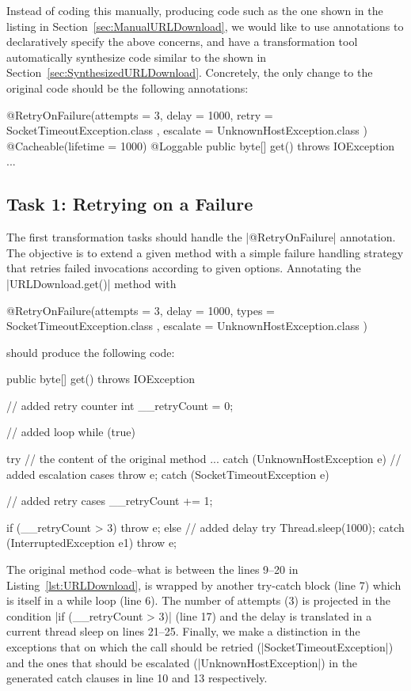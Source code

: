 Instead of coding this manually, producing code such as the one shown in the listing in Section~\ref{sec:ManualURLDownload}, we would like to use annotations to declaratively specify the above concerns, and have a transformation tool automatically synthesize code similar to the shown in Section~\ref{sec:SynthesizedURLDownload}.
Concretely, the only change to the original code should be the following annotations:
%
\begin{javacode}
@RetryOnFailure(attempts = 3, delay = 1000, retry = { SocketTimeoutException.class }, escalate = { UnknownHostException.class })
@Cacheable(lifetime = 1000)
@Loggable
public byte[] get() throws IOException { ... }
\end{javacode}

\subsection{Task 1: Retrying on a Failure}

The first transformation tasks should handle the \javainline|@RetryOnFailure| annotation.
The objective is to extend a given method with a simple failure handling strategy that retries failed invocations according to given options.
Annotating the \javainline|URLDownload.get()| method with
%
\begin{javacode}
@RetryOnFailure(attempts = 3, delay = 1000, types = { SocketTimeoutException.class }, escalate = { UnknownHostException.class })
\end{javacode}
%
should produce the following code:
%
\begin{javacode}
public byte[] get() throws IOException {
  // added retry counter 
  int __retryCount = 0;

  // added loop
  while (true) {
    try {
      // the content of the original method
      ...
    } catch (UnknownHostException e) {
      // added escalation cases
      throw e;
    } catch (SocketTimeoutException e) {
      // added retry cases
      __retryCount += 1;

      if (__retryCount > 3) {
        throw e;
      } else {
        // added delay 
        try {
          Thread.sleep(1000);
        } catch (InterruptedException e1) {
          throw e;
        }
      }
    }
  }
}
\end{javacode}

The original method code--\Ie what is between the lines 9--20 in Listing~\ref{lst:URLDownload}, is wrapped by another try-catch block (line 7) which is itself in a while loop (line 6).
The number of attempts (3) is projected in the condition \javainline|if (__retryCount > 3)| (line 17) and the delay is translated in a current thread sleep on lines 21--25.
Finally, we make a distinction in the exceptions that on which the call should be retried (\javainline|SocketTimeoutException|) and the ones that should be escalated (\javainline|UnknownHostException|) in the generated catch clauses in line 10 and 13 respectively.

